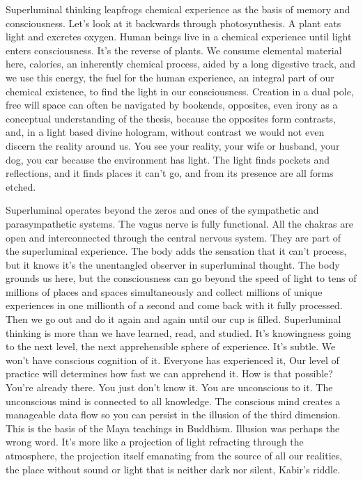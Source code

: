 \documentclass[letterpaper,9pt,twoside,titlepage,onecolumn,openany]{book}
\begin{document}
Superluminal thinking leapfrogs chemical experience as the basis of
memory and consciousness. Let's look at it backwards through
photosynthesis. A plant eats light and excretes oxygen. Human beings
live in a chemical experience until light enters consciousness. It's the
reverse of plants. We consume elemental material here, calories, an
inherently chemical process, aided by a long digestive track, and we use
this energy, the fuel for the human experience, an integral part of our
chemical existence, to find the light in our consciousness. Creation in
a dual pole, free will space can often be navigated by bookends,
opposites, even irony as a conceptual understanding of the thesis,
because the opposites form contrasts, and, in a light based divine
hologram, without contrast we would not even discern the reality around
us. You see your reality, your wife or husband, your dog, you car
because the environment has light. The light finds pockets and
reflections, and it finds places it can't go, and from its presence are
all forms etched.

Superluminal operates beyond the zeros and ones of the sympathetic and
parasympathetic systems. The vagus nerve is fully functional. All the
chakras are open and interconnected through the central nervous system.
They are part of the superluminal experience. The body adds the
sensation that it can't process, but it knows it's the unentangled
observer in superluminal thought. The body grounds us here, but the
consciousness can go beyond the speed of light to tens of millions of
places and spaces simultaneously and collect millions of unique
experiences in one millionth of a second and come back with it fully
processed. Then we go out and do it again and again until our cup is
filled. Superluminal thinking is more than we have learned, read, and
studied. It's knowingness going to the next level, the next
apprehensible sphere of experience. It's subtle. We won't have conscious
cognition of it. Everyone has experienced it, Our level of practice will
determines how fast we can apprehend it. How is that possible? You're
already there. You just don't know it. You are unconscious to it. The
unconscious mind is connected to all knowledge. The conscious mind
creates a manageable data flow so you can persist in the illusion of the
third dimension. This is the basis of the Maya teachings in Buddhism.
Illusion was perhaps the wrong word. It's more like a projection of
light refracting through the atmosphere, the projection itself emanating
from the source of all our realities, the place without sound or light
that is neither dark nor silent, Kabir's riddle.
\end{document}
